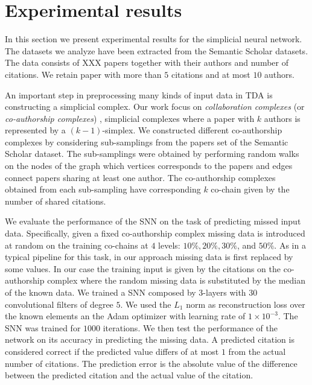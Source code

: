 \section{Experimental results}
In this section we present experimental results for the simplicial neural network. The datasets we analyze have been extracted from the Semantic Scholar datasets. The data consists of XXX papers together with their authors and number of citations. We retain paper with more than $5$ citations and at most $10$ authors.

An important step in preprocessing many kinds of input data in TDA is constructing a simplicial complex. Our work focus on \emph{collaboration complexes} (or \emph{co-authorship complexes}) , simplicial complexes where a paper with $k$ authors is represented by a $(k-1)$-simplex. We constructed different co-authorship complexes by considering sub-samplings from the papers set of the Semantic Scholar dataset. The sub-samplings were obtained by performing random walks on the nodes of the graph which vertices corresponds to the papers and edges connect papers sharing at least one author. The co-authorship complexes obtained from each sub-sampling  have corresponding $k$ co-chain given by the number of shared citations.

We evaluate the performance of the SNN on the task of predicting missed input data. 
Specifically, given a fixed co-authorship complex missing data is introduced 
at random on the training co-chains at $4$ levels: $10\%,  20\%,  30\%$, and $50\% $.   As in a typical pipeline for this task, in our approach missing data is first replaced by some values. In our case the training input is given by the citations on the co-authorship complex where the random missing data is substituted by the median of the known data. We trained a SNN composed by $3$-layers with $30$ convolutional filters of degree $5$. We used the $L_1$ norm as reconstruction loss over the known elements an the Adam optimizer with learning rate of $1\times 10^{-3}$. The SNN was trained for $1000$ iterations. We then test the performance of the network on its accuracy in predicting the missing data. A predicted citation is considered correct if the predicted value differs of at most $1$ from the actual number of citations. The prediction error is the absolute value of the difference between the predicted citation and the actual value of the citation. 

